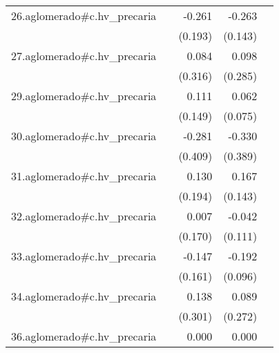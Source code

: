 {\begin{longtable}{l*{4}{D{.}{.}{-1}}}
\addlinespace
26.aglomerado#c.hv\_precaria&                     &      -0.261         &      -0.263         &                     \\
            &                     &     (0.193)         &     (0.143)         &                     \\
\addlinespace
27.aglomerado#c.hv\_precaria&                     &       0.084         &       0.098         &                     \\
            &                     &     (0.316)         &     (0.285)         &                     \\
\addlinespace
29.aglomerado#c.hv\_precaria&                     &       0.111         &       0.062         &                     \\
            &                     &     (0.149)         &     (0.075)         &                     \\
\addlinespace
30.aglomerado#c.hv\_precaria&                     &      -0.281         &      -0.330         &                     \\
            &                     &     (0.409)         &     (0.389)         &                     \\
\addlinespace
31.aglomerado#c.hv\_precaria&                     &       0.130         &       0.167         &                     \\
            &                     &     (0.194)         &     (0.143)         &                     \\
\addlinespace
32.aglomerado#c.hv\_precaria&                     &       0.007         &      -0.042         &                     \\
            &                     &     (0.170)         &     (0.111)         &                     \\
\addlinespace
33.aglomerado#c.hv\_precaria&                     &      -0.147         &      -0.192\sym{*}  &                     \\
            &                     &     (0.161)         &     (0.096)         &                     \\
\addlinespace
34.aglomerado#c.hv\_precaria&                     &       0.138         &       0.089         &                     \\
            &                     &     (0.301)         &     (0.272)         &                     \\
\addlinespace
36.aglomerado#c.hv\_precaria&                     &       0.000         &       0.000         &                     \\

\end{longtable}}
